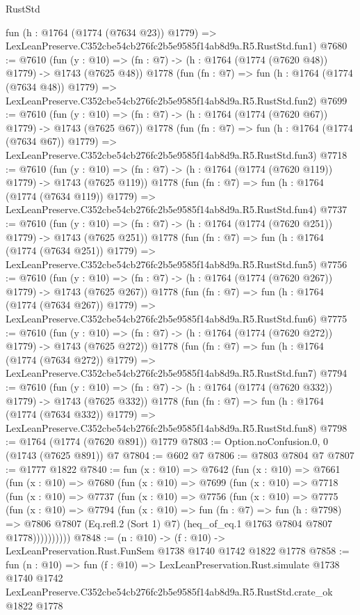 \begin{lexlean}{RustStd}
\begin{coremodule}
    fun (h : @1764 (@1774 (@7634 @23)) @1779) =>
    LexLeanPreserve.C352cbe54cb276fc2b5e9585f14ab8d9a.R5.RustStd.fun1)
@7680 := @7610
    (fun (y : @10) => (fn : @7) -> (h : @1764 (@1774 (@7620 @48)) @1779) -> @1743 (@7625 @48))
    @1778
    (fun (fn : @7) =>
    fun (h : @1764 (@1774 (@7634 @48)) @1779) =>
    LexLeanPreserve.C352cbe54cb276fc2b5e9585f14ab8d9a.R5.RustStd.fun2)
@7699 := @7610
    (fun (y : @10) => (fn : @7) -> (h : @1764 (@1774 (@7620 @67)) @1779) -> @1743 (@7625 @67))
    @1778
    (fun (fn : @7) =>
    fun (h : @1764 (@1774 (@7634 @67)) @1779) =>
    LexLeanPreserve.C352cbe54cb276fc2b5e9585f14ab8d9a.R5.RustStd.fun3)
@7718 := @7610
    (fun (y : @10) => (fn : @7) -> (h : @1764 (@1774 (@7620 @119)) @1779) -> @1743 (@7625 @119))
    @1778
    (fun (fn : @7) =>
    fun (h : @1764 (@1774 (@7634 @119)) @1779) =>
    LexLeanPreserve.C352cbe54cb276fc2b5e9585f14ab8d9a.R5.RustStd.fun4)
@7737 := @7610
    (fun (y : @10) => (fn : @7) -> (h : @1764 (@1774 (@7620 @251)) @1779) -> @1743 (@7625 @251))
    @1778
    (fun (fn : @7) =>
    fun (h : @1764 (@1774 (@7634 @251)) @1779) =>
    LexLeanPreserve.C352cbe54cb276fc2b5e9585f14ab8d9a.R5.RustStd.fun5)
@7756 := @7610
    (fun (y : @10) => (fn : @7) -> (h : @1764 (@1774 (@7620 @267)) @1779) -> @1743 (@7625 @267))
    @1778
    (fun (fn : @7) =>
    fun (h : @1764 (@1774 (@7634 @267)) @1779) =>
    LexLeanPreserve.C352cbe54cb276fc2b5e9585f14ab8d9a.R5.RustStd.fun6)
@7775 := @7610
    (fun (y : @10) => (fn : @7) -> (h : @1764 (@1774 (@7620 @272)) @1779) -> @1743 (@7625 @272))
    @1778
    (fun (fn : @7) =>
    fun (h : @1764 (@1774 (@7634 @272)) @1779) =>
    LexLeanPreserve.C352cbe54cb276fc2b5e9585f14ab8d9a.R5.RustStd.fun7)
@7794 := @7610
    (fun (y : @10) => (fn : @7) -> (h : @1764 (@1774 (@7620 @332)) @1779) -> @1743 (@7625 @332))
    @1778
    (fun (fn : @7) =>
    fun (h : @1764 (@1774 (@7634 @332)) @1779) =>
    LexLeanPreserve.C352cbe54cb276fc2b5e9585f14ab8d9a.R5.RustStd.fun8)
@7798 := @1764 (@1774 (@7620 @891)) @1779
@7803 := Option.noConfusion.{0, 0} (@1743 (@7625 @891)) @7
@7804 := @602 @7
@7806 := @7803 @7804 @7
@7807 := @1777 @1822
@7840 := fun (x : @10) =>
  @7642
    (fun (x : @10) =>
    @7661
      (fun (x : @10) =>
      @7680
        (fun (x : @10) =>
        @7699
          (fun (x : @10) =>
          @7718
            (fun (x : @10) =>
            @7737
              (fun (x : @10) =>
              @7756
                (fun (x : @10) =>
                @7775
                  (fun (x : @10) =>
                  @7794
                    (fun (x : @10) =>
                    fun (fn : @7) =>
                    fun (h : @7798) =>
                    @7806
                      @7807
                      (Eq.refl.{2} (Sort 1) @7)
                      (heq_of_eq.{1} @1763 @7804 @7807 @1778))))))))))
@7848 := (n : @10) -> (f : @10) -> LexLeanPreservation.Rust.FunSem @1738 @1740 @1742 @1822 @1778
@7858 := fun (n : @10) =>
  fun (f : @10) =>
  LexLeanPreservation.Rust.simulate
    @1738
    @1740
    @1742
    LexLeanPreserve.C352cbe54cb276fc2b5e9585f14ab8d9a.R5.RustStd.crate_ok
    @1822
    @1778
\end{coremodule}
\end{lexlean}
